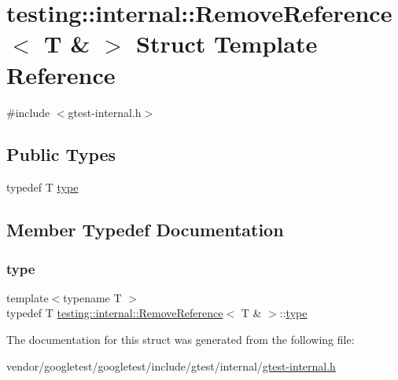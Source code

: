 \hypertarget{structtesting_1_1internal_1_1_remove_reference_3_01_t_01_6_01_4}{}\section{testing\+:\+:internal\+:\+:Remove\+Reference$<$ T \& $>$ Struct Template Reference}
\label{structtesting_1_1internal_1_1_remove_reference_3_01_t_01_6_01_4}


{\ttfamily \#include $<$gtest-\/internal.\+h$>$}

\subsection*{Public Types}
\begin{DoxyCompactItemize}
\item 
typedef T \hyperlink{structtesting_1_1internal_1_1_remove_reference_3_01_t_01_6_01_4_a3d0f32a66759f333c2dd66aa31005e6d}{type}
\end{DoxyCompactItemize}


\subsection{Member Typedef Documentation}
\mbox{\label{structtesting_1_1internal_1_1_remove_reference_3_01_t_01_6_01_4_a3d0f32a66759f333c2dd66aa31005e6d}} 
\subsubsection{\texorpdfstring{type}{type}}
{\footnotesize\ttfamily template$<$typename T $>$ \\
typedef T \hyperlink{structtesting_1_1internal_1_1_remove_reference}{testing\+::internal\+::\+Remove\+Reference}$<$ T \& $>$\+::\hyperlink{structtesting_1_1internal_1_1_remove_reference_3_01_t_01_6_01_4_a3d0f32a66759f333c2dd66aa31005e6d}{type}}



The documentation for this struct was generated from the following file\+:\begin{DoxyCompactItemize}
\item 
vendor/googletest/googletest/include/gtest/internal/\hyperlink{gtest-internal_8h}{gtest-\/internal.\+h}\end{DoxyCompactItemize}
